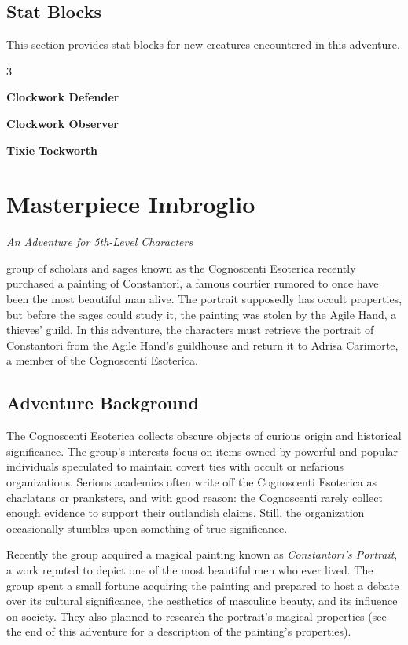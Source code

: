 \documentclass[10pt,a4paper,twoside,bg=print,twocolumn,openany,nodeprecatedcode]{dndbook}
\begin{document}
\section{Stat Blocks}
This section provides stat blocks for new creatures encountered in this adventure.


\begin{itemize}
\begin{multicols}{3}
\item \textbf{Clockwork Defender}
\item \textbf{Clockwork Observer}
\item \textbf{Tixie Tockworth}
\end{multicols}

\end{itemize}

\chapter{Masterpiece Imbroglio}
\textit{An Adventure for 5th-Level Characters}

 group of scholars and sages known as the Cognoscenti Esoterica recently purchased a painting of Constantori, a famous courtier rumored to once have been the most beautiful man alive. The portrait supposedly has occult properties, but before the sages could study it, the painting was stolen by the Agile Hand, a thieves' guild. In this adventure, the characters must retrieve the portrait of Constantori from the Agile Hand's guildhouse and return it to Adrisa Carimorte, a member of the Cognoscenti Esoterica.


\section{Adventure Background}
The Cognoscenti Esoterica collects obscure objects of curious origin and historical significance. The group's interests focus on items owned by powerful and popular individuals speculated to maintain covert ties with occult or nefarious organizations. Serious academics often write off the Cognoscenti Esoterica as charlatans or pranksters, and with good reason: the Cognoscenti rarely collect enough evidence to support their outlandish claims. Still, the organization occasionally stumbles upon something of true significance.

Recently the group acquired a magical painting known as \textit{Constantori's Portrait}, a work reputed to depict one of the most beautiful men who ever lived. The group spent a small fortune acquiring the painting and prepared to host a debate over its cultural significance, the aesthetics of masculine beauty, and its influence on society. They also planned to research the portrait's magical properties (see the end of this adventure for a description of the painting's properties).
\end{document}
